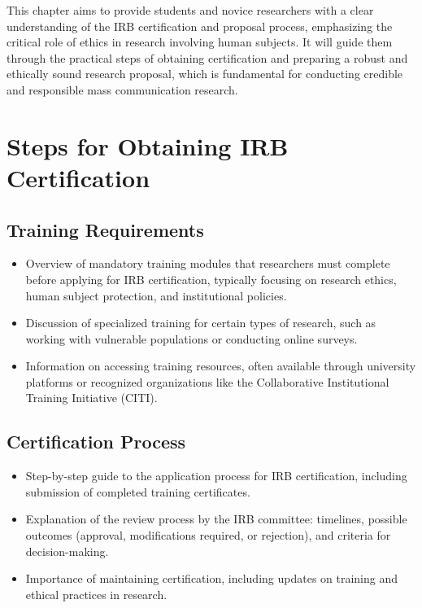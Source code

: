 \documentclass[
]{book}
\begin{document}
This chapter aims to provide students and novice researchers with a clear understanding of the IRB certification and proposal process, emphasizing the critical role of ethics in research involving human subjects. It will guide them through the practical steps of obtaining certification and preparing a robust and ethically sound research proposal, which is fundamental for conducting credible and responsible mass communication research.

\hypertarget{steps-for-obtaining-irb-certification}{%
\section*{Steps for Obtaining IRB Certification}\label{steps-for-obtaining-irb-certification}}

\hypertarget{training-requirements}{%
\subsection*{Training Requirements}\label{training-requirements}}

\begin{itemize}
\item
  Overview of mandatory training modules that researchers must complete before applying for IRB certification, typically focusing on research ethics, human subject protection, and institutional policies.
\item
  Discussion of specialized training for certain types of research, such as working with vulnerable populations or conducting online surveys.
\item
  Information on accessing training resources, often available through university platforms or recognized organizations like the Collaborative Institutional Training Initiative (CITI).
\end{itemize}

\hypertarget{certification-process}{%
\subsection*{Certification Process}\label{certification-process}}

\begin{itemize}
\item
  Step-by-step guide to the application process for IRB certification, including submission of completed training certificates.
\item
  Explanation of the review process by the IRB committee: timelines, possible outcomes (approval, modifications required, or rejection), and criteria for decision-making.
\item
  Importance of maintaining certification, including updates on training and ethical practices in research.
\end{itemize}
\end{document}
